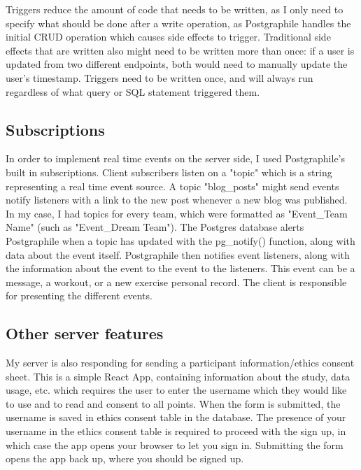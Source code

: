 \documentclass{l4proj}
\begin{document}
Triggers reduce the amount of code that needs to be written, as I only need to specify what should be done after a write operation, as Postgraphile handles the initial CRUD operation which causes side effects to trigger. Traditional side effects that are written also might need to be written more than once: if a user is updated from two different endpoints, both would need to manually update the user's timestamp. Triggers need to be written once, and will always run regardless of what query or SQL statement triggered them.

\subsection{Subscriptions}
In order to implement real time events on the server side, I used Postgraphile's built in subscriptions. Client subscribers listen on a "topic" which is a string representing a real time event source. A topic "blog\_posts" might send events notify listeners with a link to the new post whenever a new blog was published. In my case, I had topics for every team, which were formatted as "Event\_{Team Name}" (such as "Event\_Dream Team"). The Postgres database alerts Postgraphile when a topic has updated with the pg\_notify() function, along with data about the event itself. Postgraphile then notifies event listeners, along with the information about the event to the event to the listeners. This event can be a message, a workout, or a new exercise personal record. The client is responsible for presenting the different events. 

\subsection{Other server features}
My server is also responding for sending a participant information/ethics consent sheet. This is a simple React App, containing information about the study, data usage, etc. which requires the user to enter the username which they would like to use and to read and consent to all points. When the form is submitted, the username is saved in ethics consent table in the database. The presence of your username in the ethics consent table is required to proceed with the sign up, in which case the app opens your browser to let you sign in. Submitting the form opens the app back up, where you should be signed up.
\end{document}
